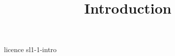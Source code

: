 \documentclass [xcolor=table] {beamer}
\title {Introduction}
\begin{document}
 {licence}
 {sl1-1-intro}
\end{document}
